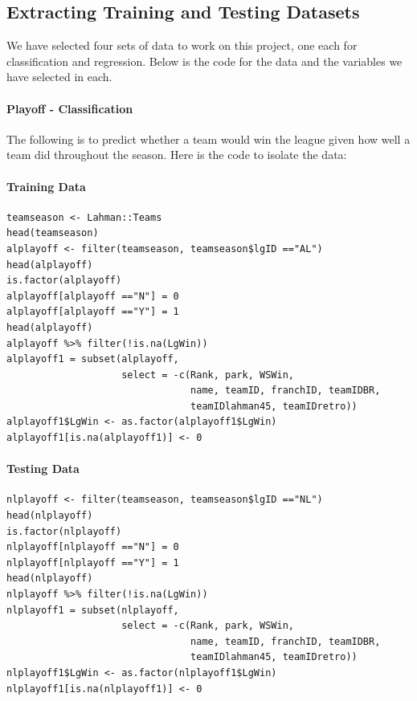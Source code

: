 \documentclass[11pt,a4paper]{report}
\begin{document}
\begin{appendices}
\chapter{Extracting Training and Testing Datasets}
We have selected four sets of data to work on this project, one each for classification and regression. Below is the code for the data and the variables we have selected in each.

\subsubsection{Playoff - Classification}
The following is to predict whether a team would win the league given how well a team did throughout the season. Here is the code to isolate the data:
\subsubsection{Training Data}
\begin{verbatim}
teamseason <- Lahman::Teams
head(teamseason)
alplayoff <- filter(teamseason, teamseason$lgID =="AL")
head(alplayoff)
is.factor(alplayoff)
alplayoff[alplayoff =="N"] = 0
alplayoff[alplayoff =="Y"] = 1
head(alplayoff)
alplayoff %>% filter(!is.na(LgWin))
alplayoff1 = subset(alplayoff, 
                    select = -c(Rank, park, WSWin, 
                                name, teamID, franchID, teamIDBR,
                                teamIDlahman45, teamIDretro))
alplayoff1$LgWin <- as.factor(alplayoff1$LgWin)
alplayoff1[is.na(alplayoff1)] <- 0
\end{verbatim}





\subsubsection{Testing Data}
\begin{verbatim}
nlplayoff <- filter(teamseason, teamseason$lgID =="NL")
head(nlplayoff)
is.factor(nlplayoff)
nlplayoff[nlplayoff =="N"] = 0
nlplayoff[nlplayoff =="Y"] = 1
head(nlplayoff)
nlplayoff %>% filter(!is.na(LgWin))
nlplayoff1 = subset(nlplayoff,
                    select = -c(Rank, park, WSWin, 
                                name, teamID, franchID, teamIDBR,
                                teamIDlahman45, teamIDretro))
nlplayoff1$LgWin <- as.factor(nlplayoff1$LgWin)
nlplayoff1[is.na(nlplayoff1)] <- 0
\end{verbatim}




\end{appendices}
\end{document}
